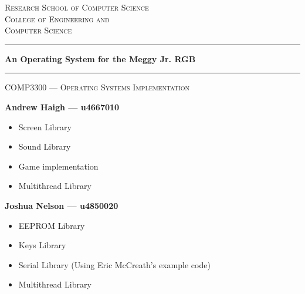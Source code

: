 \documentclass[a4paper]{article}
\begin{document}
\begin{titlepage}
 
\begin{center}

\textsc{\Large Research School of Computer Science}\\[0.5cm]
\textsc{\Large College of Engineering and}\\[0.2cm]
\textsc{\Large Computer Science}\\[0.5cm]


 
\vspace{1.4cm}

\hrule

\vspace{1.4cm}

{ \huge \bfseries An Operating System for the Meggy Jr. RGB}
\vspace{1.4cm}
\hrule
\vspace{1.0cm}

\textsc{\large COMP3300 --- Operating Systems Implementation}

\vspace{1.0cm}

\vspace{1.0cm}
{ \Large \bfseries Andrew Haigh --- u4667010}
\begin{itemize}
\item Screen Library
\item Sound Library
\item Game implementation
\item Multithread Library
\end{itemize}
\vspace{1.0cm}
{ \Large \bfseries Joshua Nelson --- u4850020}
\begin{itemize}
 \item EEPROM Library
 \item Keys Library
 \item Serial Library (Using Eric McCreath's example code)
 \item Multithread Library
\end{itemize}
\vfill
\begin{abstract}
A rudimentary operating system for the Meggy Jr. RGB, a handheld device based on the Atmel AVR architecture. A library useful to game developers was created, including functions for interacting with the screen, sound, keys, memory, I/O, and multithreading.
\end{abstract}
 
\end{center}

\end{titlepage}
\end{document}
